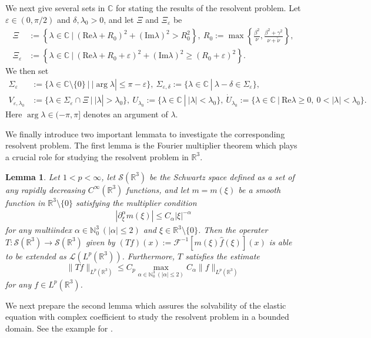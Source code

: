 \documentclass[dvipdfmx,12pt]{article}
\newtheorem{lem}[dfn]{Lemma}
\begin{document}
We next give several sets in $\mathbb{C}$ for stating the results of the resolvent problem. Let $\varepsilon\in (0,\pi/2)$ and $\delta,\lambda_0>0$, and let $\Xi$ and $\Xi_\varepsilon$ be
\begin{align*}
\Xi&:=\left\{\lambda\in\mathbb{C}~|~(\mathrm{Re}\lambda+R_0)^2+(\mathrm{Im}\lambda)^2>R_0^2\right\},~R_0:=\max\left\{\frac{\beta^2}{\nu},\frac{\beta^2+\gamma^2}{\nu+\tilde{\nu}}\right\}, \\
\Xi_\varepsilon&:=\left\{\lambda\in\mathbb{C}~|~(\mathrm{Re}\lambda+R_0+\varepsilon)^2+(\mathrm{Im}\lambda)^2\ge(R_0+\varepsilon)^2\right\}.
\end{align*}
We then set
\begin{align*}
\Sigma_{\varepsilon}&:=\{\lambda\in\mathbb{C}\setminus\{0\}~|~|\arg \lambda|\le \pi-\varepsilon\},~ \Sigma_{\varepsilon, \delta} :=\{\lambda\in\mathbb{C}~|~\lambda-\delta\in \Sigma_\varepsilon\}, \\
V_{\varepsilon,\lambda_0}&:=\{\lambda\in\Sigma_{\varepsilon}\cap \Xi~|~|\lambda|>\lambda_0\}, ~
U_{\lambda_0}:=\{\lambda\in \mathbb{C}~|~|\lambda|<\lambda_0\},
~
\Dot{U}_{\lambda_0}:=\{\lambda\in \mathbb{C}~|~\mathrm{Re}\lambda\ge0,~0<|\lambda|<\lambda_0\}.
\end{align*}
Here $\arg \lambda\in(-\pi,\pi]$ denotes an argument of $\lambda$.

\vskip2mm

We finally introduce two important lemmata to investigate the corresponding resolvent problem. The first lemma is the Fourier multiplier theorem which plays a crucial role for studying the resolvent problem in $\mathbb{R}^3$. 
\begin{lem}\label{FMthm}
Let $1<p<\infty$, let $\mathcal{S}(\mathbb{R}^3)$ be the Schwartz space defined as a set of any rapidly decreasing $C^\infty(\mathbb{R}^3)$ functions, and let $m=m(\xi)$ be a smooth function in $\mathbb{R}^3 \setminus \{0\}$ satisfying the multiplier condition
\begin{align*}
|\partial_\xi^\alpha m(\xi)|\le C_\alpha |\xi|^{-\alpha}
\end{align*}
for any multiindex $\alpha\in\mathbb{N}_0^3~(|\alpha|\le 2)$ and $\xi\in\mathbb{R}^3\setminus\{0\}$. Then the operater $T:\mathcal{S}(\mathbb{R}^3)\to \mathcal{S}(\mathbb{R}^3)$ given by $(Tf)(x):=\mathcal{F}^{-1}[m(\xi)\widehat{f}(\xi)](x)$ is able to be extended as $\mathcal{L}(L^p(\mathbb{R}^3))$. Furthermore, $T$ satisfies the estimate
\[
\|Tf\|_{L^p(\mathbb{R}^3)}\le C_p\max_{\alpha\in\mathbb{N}_0^3~(|\alpha|\le 2)} C_\alpha\|f\|_{L^p(\mathbb{R}^3)}
\]
for any $f\in L^p(\mathbb{R}^3)$.
\end{lem}
We next prepare the second lemma which assures the solvability of the elastic equation with complex coefficient to study the  resolvent problem in a bounded domain. See the example for \cite[Proposition 2.1]{SWZ11}.
\end{document}
